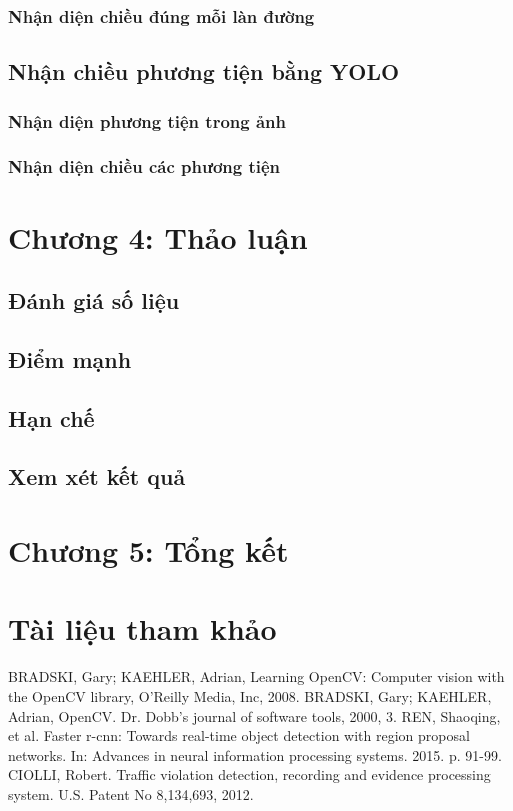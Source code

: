 \documentclass[14pt,oneside,a4paper]{extreport}
\begin{document}
\subsubsection{Nhận diện chiều đúng mỗi làn đường}
\subsection{Nhận chiều phương tiện bằng YOLO}
\subsubsection{Nhận diện phương tiện trong ảnh}
\subsubsection{Nhận diện chiều các phương tiện}
\section{Chương 4: Thảo luận}
\subsection{Đánh giá số liệu}
\subsection{Điểm mạnh}
\subsection{Hạn chế}
\subsection{Xem xét kết quả}
\pagebreak
\section{Chương 5: Tổng kết}
\section{Tài liệu tham khảo}
\renewcommand{\labelenumi}{[\arabic{enumi}]}
\begin{thebibliography}{9}
	 BRADSKI, Gary; KAEHLER, Adrian, Learning OpenCV: Computer vision with the OpenCV library, O'Reilly Media, Inc, 2008.
	 BRADSKI, Gary; KAEHLER, Adrian, OpenCV. Dr. Dobb’s journal of software tools, 2000, 3.
	 REN, Shaoqing, et al. Faster r-cnn: Towards real-time object detection with region proposal networks. In: Advances in neural information processing systems. 2015. p. 91-99.
	 CIOLLI, Robert. Traffic violation detection, recording and evidence processing system. U.S. Patent No 8,134,693, 2012.
\end{thebibliography}
\end{document}
